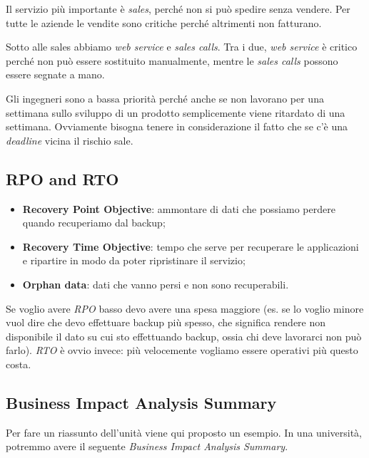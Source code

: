 Il servizio più importante è \textit{sales}, perché non si può spedire senza
vendere. Per tutte le aziende le vendite sono critiche perché altrimenti non
fatturano.

Sotto alle sales abbiamo \textit{web service} e \textit{sales calls}. Tra i
due, \textit{web service} è critico perché non può essere sostituito
manualmente, mentre le \textit{sales calls} possono essere segnate a mano.

Gli ingegneri sono a bassa priorità perché anche se non lavorano per una
settimana sullo sviluppo di un prodotto semplicemente viene ritardato di una
settimana. Ovviamente bisogna tenere in considerazione il fatto che se c'è una
\textit{deadline} vicina il rischio sale.

\subsection{RPO and RTO}

\begin{itemize}
 \item \textbf{Recovery Point Objective}: ammontare di dati che possiamo
perdere quando recuperiamo dal backup;

 \item \textbf{Recovery Time Objective}: tempo che serve per recuperare le
applicazioni e ripartire in modo da poter ripristinare il servizio;

 \item \textbf{Orphan data}: dati che vanno persi e non sono recuperabili.
\end{itemize}

Se voglio avere \textit{RPO} basso devo avere una spesa maggiore (es. se lo
voglio minore vuol dire che devo effettuare backup più spesso, che significa
rendere non disponibile il dato su cui sto effettuando backup, ossia chi deve
lavorarci non può farlo).
\textit{RTO} è ovvio invece: più velocemente vogliamo essere operativi più
questo costa.

\subsection{Business Impact Analysis Summary}

Per fare un riassunto dell'unità viene qui proposto un esempio. In una
università, potremmo avere il seguente \textit{Business Impact Analysis
Summary}.

